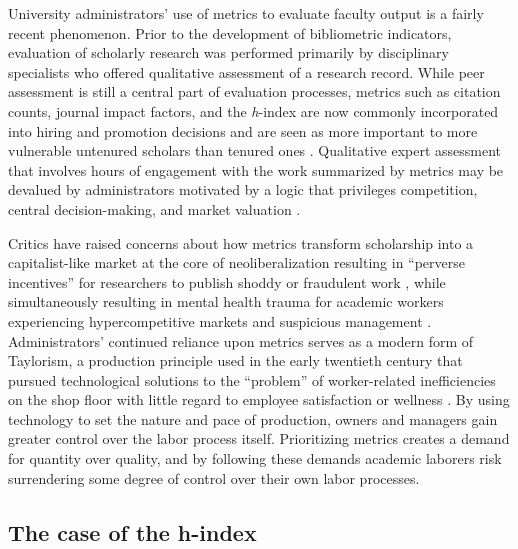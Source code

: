 \documentclass[
  10pt,
  letterpaper,
]{article}
\begin{document}
University administrators' use of metrics to evaluate faculty output is
a fairly recent phenomenon. Prior to the development of bibliometric
indicators, evaluation of scholarly research was performed primarily by
disciplinary specialists who offered qualitative assessment of a
research record. While peer assessment is still a central part of
evaluation processes, metrics such as citation counts, journal impact
factors, and the \emph{h}-index are now commonly incorporated into
hiring and promotion decisions \citep{mckiernan_metaresearch_2019} and
are seen as more important to more vulnerable untenured scholars than
tenured ones \citep{niles_why_2020}. Qualitative expert assessment that
involves hours of engagement with the work summarized by metrics may be
devalued by administrators motivated by a logic that privileges
competition, central decision-making, and market valuation
\citep{berg_producing_2016}.

Critics have raised concerns about how metrics transform scholarship
into a capitalist-like market at the core of neoliberalization resulting
in ``perverse incentives'' for researchers to publish shoddy or
fraudulent work \citep{edwards_academic_2017}, while simultaneously
resulting in mental health trauma for academic workers experiencing
hypercompetitive markets and suspicious management
\citep{forrester_mental_2021}. Administrators' continued reliance upon
metrics serves as a modern form of Taylorism, a production principle
used in the early twentieth century that pursued technological solutions
to the ``problem'' of worker-related inefficiencies on the shop floor
with little regard to employee satisfaction or wellness
\citep{braverman_labor_1998}. By using technology to set the nature and
pace of production, owners and managers gain greater control over the
labor process itself. Prioritizing metrics creates a demand for quantity
over quality, and by following these demands academic laborers risk
surrendering some degree of control over their own labor processes.

\hypertarget{the-case-of-the-h-index}{%
\subsection{The case of the h-index}\label{the-case-of-the-h-index}}
\end{document}
